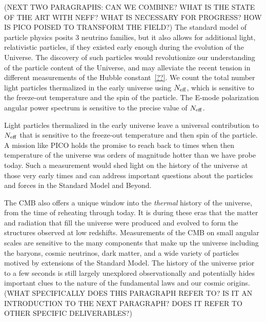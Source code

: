 \documentclass[PICOReport.tex]{subfiles}
\begin{document}
(NEXT TWO PARAGRAPHS: CAN WE COMBINE? WHAT IS THE STATE OF THE ART WITH NEFF? WHAT 
IS NECESSARY FOR PROGRESS? HOW IS PICO POISED TO TRANSFORM THE FIELD?)
The standard model of particle physics posits 3 neutrino families, but it also allows for additional light, relativistic particles, if 
they existed early enough during the evolution of the Universe. The discovery of such particles would revolutionize 
our understanding of the particle content of the Universe, 
and may alleviate the recent tension in different measurements of the Hubble constant~\ref{??}.  We count the total number 
light particles thermalized in the early universe using ${N_{\rm eff}}$, which is sensitive to the freeze-out temperature and 
the spin of the particle. The E-mode polarization angular power spectrum is sensitive to the precise value of ${N_{\rm eff}}$.  

Light particles thermalized in the early universe leave a universal contribution to ${N_{\rm eff}}$ that is sensitive to the 
freeze-out temperature and then spin of the particle.  A mission like PICO holds the promise to reach 
back to times when then temperature of the universe was orders of magnitude hotter than we have probe today.  
Such a measurement would shed light on the history of the universe at those very early times and can address 
important questions about the particles and forces in the Standard Model and Beyond.


The CMB also offers a unique window into the {\it thermal} history of the universe, from the time of reheating through today.  
It is during these eras that the matter and radiation that fill the universe were produced and evolved to form the structures 
observed at low redshifts.  Measurements of the CMB on small angular scales are sensitive to the many components 
that make up the universe including the baryons, cosmic neutrinos, dark matter, and a wide variety of particles 
motived by extensions of the Standard Model.  The history of the universe prior to a few seconds is still largely 
unexplored observationally and potentially hides important clues to the nature of the fundamental laws and our cosmic origins.
(WHAT SPECIFICALLY DOES THIS PARAGRAPH REFER TO? IS IT AN INTRODUCTION TO THE NEXT PARAGRAPH? 
DOES IT REFER TO OTHER SPECIFIC DELIVERABLES?)
\end{document}
